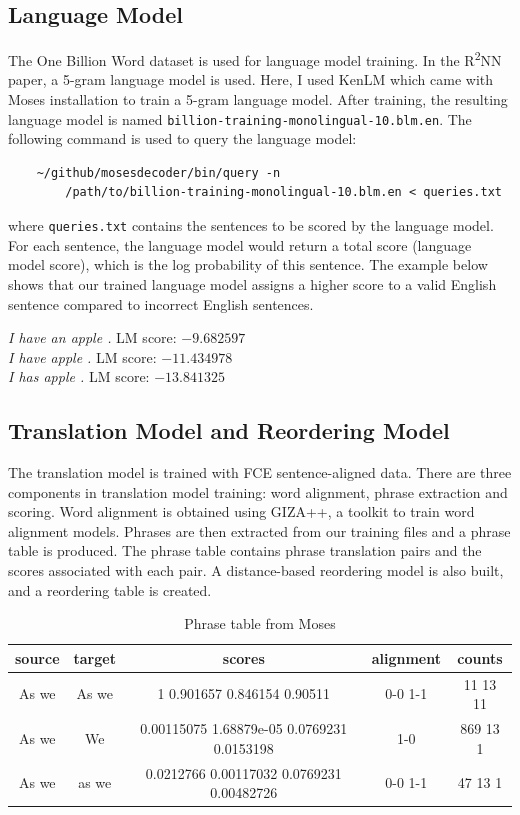 \documentclass[12pt,a4paper,twoside,openright]{report}
\begin{document}
\subsection{Language Model}
The One Billion Word dataset is used for language model training. In the R\textsuperscript{2}NN paper, a 5-gram language model is used. Here, I used KenLM which came with Moses installation to train a 5-gram language model. After training, the resulting language model is named \texttt{billion-training-monolingual-10.blm.en}. The following command is used to query the language model:
\begin{verbatim}
    ~/github/mosesdecoder/bin/query -n 
        /path/to/billion-training-monolingual-10.blm.en < queries.txt
\end{verbatim}

where \texttt{queries.txt} contains the sentences to be scored by the language model. For each sentence, the language model would return a total score (language model score), which is the log probability of this sentence. The example below shows that our trained language model assigns a higher score to a valid English sentence compared to incorrect English sentences.

\hfill\begin{minipage}{\dimexpr\textwidth-1cm}
    \textit{I have an apple .} LM score: $-9.682597$\\
    \textit{I have apple .} LM score: $-11.434978$\\
    \textit{I has apple .} LM score: $-13.841325$
\end{minipage}

\subsection{Translation Model and Reordering Model}
The translation model is trained with FCE sentence-aligned data. There are three components in translation model training: word alignment, phrase extraction and scoring. Word alignment is obtained using GIZA++, a toolkit to train word alignment models. Phrases are then extracted from our training files and a phrase table is produced. The phrase table contains phrase translation pairs and the scores associated with each pair. A distance-based reordering model is also built, and a reordering table is created. 

\begin{table}[ht]
\centering
\begin{tabular}{ |c|c|c|c|c| } 
 \hline
 source & target & scores & alignment & counts \\ [0.5ex] 
 \hline
 As we & As we & 1 0.901657 0.846154 0.90511 & 0-0 1-1 & 11 13 11\\
 As we & We & 0.00115075 1.68879e-05 0.0769231 0.0153198 & 1-0 & 869 13 1\\
 As we & as we & 0.0212766 0.00117032 0.0769231 0.00482726 & 0-0 1-1 & 47 13 1\\
 \hline
\end{tabular}
\caption{Phrase table from Moses}
\label{table:phrase_table}
\end{table}
\end{document}
